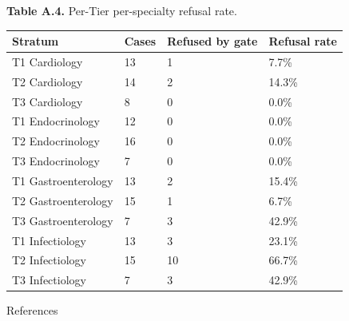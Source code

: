 \documentclass[
  american,
  a4paper,
]{article}
\begin{document}
\textbf{Table A.4.} Per-Tier per-specialty refusal rate.

\begin{longtable}[]{@{}llll@{}}
\toprule\noalign{}
Stratum & Cases & Refused by gate & Refusal rate \\
\midrule\noalign{}
\endhead
\bottomrule\noalign{}
\endlastfoot
T1 Cardiology & 13 & 1 & 7.7\% \\
T2 Cardiology & 14 & 2 & 14.3\% \\
T3 Cardiology & 8 & 0 & 0.0\% \\
T1 Endocrinology & 12 & 0 & 0.0\% \\
T2 Endocrinology & 16 & 0 & 0.0\% \\
T3 Endocrinology & 7 & 0 & 0.0\% \\
T1 Gastroenterology & 13 & 2 & 15.4\% \\
T2 Gastroenterology & 15 & 1 & 6.7\% \\
T3 Gastroenterology & 7 & 3 & 42.9\% \\
T1 Infectiology & 13 & 3 & 23.1\% \\
T2 Infectiology & 15 & 10 & 66.7\% \\
T3 Infectiology & 7 & 3 & 42.9\% \\
\end{longtable}

References
\end{document}
